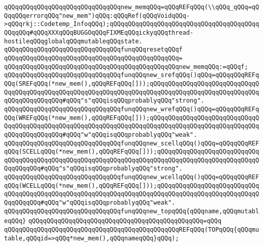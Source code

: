 \newline
\verb|qQQqqQQqqQQqqQQqqQQqqQQqqQQqqQQqnew_memqQQq=qQQqREFqQQq(\\qQQq_qQQq=qQQqqQQqerrorqQQq"new_mem")qQQq:qQQqRef(qQQqVoidqQQq->qQQqrkj::Codetemp_InfoqQQq);qQQqqQQqqQQqqQQqqQQqqQQqqQQqqQQqqQQqqQQqqQQqqQQq#qQQqXXXqQQqBUGGOqQQqFIXMEqQQqickyqQQqthread-hostileqQQqglobalqQQqmutableqQQqstate.|\newline
\newline
\verb|qQQqqQQqqQQqqQQqqQQqqQQqqQQqqQQqfunqQQqresetqQQqf|\newline
\verb|qQQqqQQqqQQqqQQqqQQqqQQqqQQqqQQqqQQqqQQqqQQqqQQq=|\newline
\verb|qQQqqQQqqQQqqQQqqQQqqQQqqQQqqQQqqQQqqQQqqQQqqQQqnew_memqQQq:=qQQqf;|\newline
\newline
\verb|qQQqqQQqqQQqqQQqqQQqqQQqqQQqqQQqfunqQQqnew_srefqQQq()qQQq=qQQqqQQqREFqQQq(SREFqQQq(*new_mem(),qQQqREFqQQq[]));qQQqqQQqqQQqqQQqqQQqqQQqqQQqqQQqqQQqqQQqqQQqqQQqqQQqqQQqqQQqqQQqqQQqqQQqqQQqqQQqqQQqqQQqqQQqqQQqqQQqqQQqqQQqqQQqqQQq#qQQq"s"qQQqisqQQqprobablyqQQq"strong".|\newline
\verb|qQQqqQQqqQQqqQQqqQQqqQQqqQQqqQQqfunqQQqnew_wrefqQQq()qQQq=qQQqqQQqREFqQQq(WREFqQQq(*new_mem(),qQQqREFqQQq[]));qQQqqQQqqQQqqQQqqQQqqQQqqQQqqQQqqQQqqQQqqQQqqQQqqQQqqQQqqQQqqQQqqQQqqQQqqQQqqQQqqQQqqQQqqQQqqQQqqQQqqQQqqQQqqQQqqQQq#qQQq"w"qQQqisqQQqprobablyqQQq"weak".|\newline
\newline
\verb|qQQqqQQqqQQqqQQqqQQqqQQqqQQqqQQqfunqQQqnew_scellqQQq()qQQq=qQQqqQQqREFqQQq(SCELLqQQq(*new_mem(),qQQqREFqQQq[]));qQQqqQQqqQQqqQQqqQQqqQQqqQQqqQQqqQQqqQQqqQQqqQQqqQQqqQQqqQQqqQQqqQQqqQQqqQQqqQQqqQQqqQQqqQQqqQQqqQQqqQQqqQQq#qQQq"s"qQQqisqQQqprobablyqQQq"strong".|\newline
\verb|qQQqqQQqqQQqqQQqqQQqqQQqqQQqqQQqfunqQQqnew_wcellqQQq()qQQq=qQQqqQQqREFqQQq(WCELLqQQq(*new_mem(),qQQqREFqQQq[]));qQQqqQQqqQQqqQQqqQQqqQQqqQQqqQQqqQQqqQQqqQQqqQQqqQQqqQQqqQQqqQQqqQQqqQQqqQQqqQQqqQQqqQQqqQQqqQQqqQQqqQQqqQQq#qQQq"w"qQQqisqQQqprobablyqQQq"weak".|\newline
\newline
\verb|qQQqqQQqqQQqqQQqqQQqqQQqqQQqqQQqfunqQQqnew_topqQQq{qQQqname,qQQqmutableqQQq}|\newline
\verb|qQQqqQQqqQQqqQQqqQQqqQQqqQQqqQQqqQQqqQQqqQQqqQQq=qQQq|\newline
\verb|qQQqqQQqqQQqqQQqqQQqqQQqqQQqqQQqqQQqqQQqqQQqqQQqREFqQQq(TOPqQQq{qQQqmutable,qQQqid=>qQQq*new_mem(),qQQqnameqQQq}qQQq);|\newline
